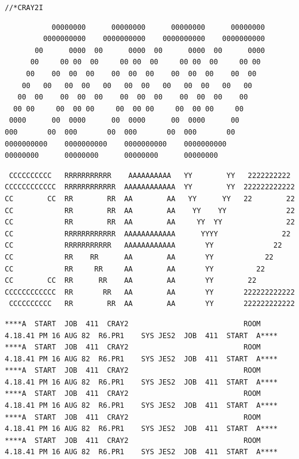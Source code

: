 
\texttt{//*\quad CRAY2\qquad I}

{\scriptsize
\begin{verbatim}
           00000000      00000000      00000000      00000000
         0000000000    0000000000    0000000000    0000000000
       00      0000  00      0000  00      0000  00      0000
      00     00 00  00     00 00  00     00 00  00     00 00
     00    00  00  00    00  00  00    00  00  00    00  00
    00   00   00  00   00   00  00   00   00  00   00   00
   00  00    00  00  00    00  00  00    00  00  00    00
  00 00     00  00 00     00  00 00     00  00 00     00
 0000      00  0000      00  0000      00  0000      00
000       00  000       00  000       00  000       00
0000000000    0000000000    0000000000    0000000000
00000000      00000000      00000000      00000000
\end{verbatim}
}

{\scriptsize
\begin{verbatim}
 CCCCCCCCCC   RRRRRRRRRRR    AAAAAAAAAA   YY        YY   2222222222
CCCCCCCCCCCC  RRRRRRRRRRRR  AAAAAAAAAAAA  YY        YY  222222222222
CC        CC  RR        RR  AA        AA   YY      YY   22        22
CC            RR        RR  AA        AA    YY    YY              22
CC            RR        RR  AA        AA     YY  YY               22
CC            RRRRRRRRRRRR  AAAAAAAAAAAA      YYYY               22
CC            RRRRRRRRRRR   AAAAAAAAAAAA       YY              22
CC            RR    RR      AA        AA       YY            22
CC            RR     RR     AA        AA       YY          22
CC        CC  RR      RR    AA        AA       YY        22
CCCCCCCCCCCC  RR       RR   AA        AA       YY       222222222222
 CCCCCCCCCC   RR        RR  AA        AA       YY       222222222222
\end{verbatim}
}

{\fontsize{4.5}{5.9}\selectfont
\begin{verbatim}
****A  START  JOB  411  CRAY2                           ROOM        4.18.41 PM 16 AUG 82  R6.PR1    SYS JES2  JOB  411  START  A****
****A  START  JOB  411  CRAY2                           ROOM        4.18.41 PM 16 AUG 82  R6.PR1    SYS JES2  JOB  411  START  A****
****A  START  JOB  411  CRAY2                           ROOM        4.18.41 PM 16 AUG 82  R6.PR1    SYS JES2  JOB  411  START  A****
****A  START  JOB  411  CRAY2                           ROOM        4.18.41 PM 16 AUG 82  R6.PR1    SYS JES2  JOB  411  START  A****
****A  START  JOB  411  CRAY2                           ROOM        4.18.41 PM 16 AUG 82  R6.PR1    SYS JES2  JOB  411  START  A****
****A  START  JOB  411  CRAY2                           ROOM        4.18.41 PM 16 AUG 82  R6.PR1    SYS JES2  JOB  411  START  A****
\end{verbatim}
}

